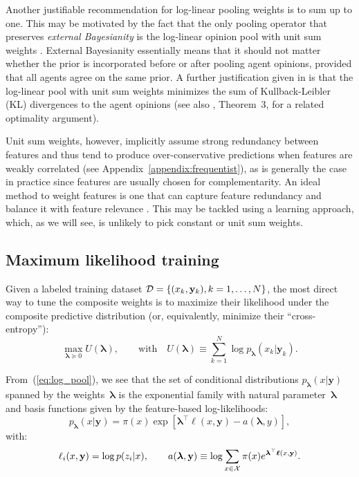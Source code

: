\documentclass[english]{scrartcl}
\def\y{{\mathbf{y}}}
\newcommand{\blambda}{{\boldsymbol{\lambda}}}
\newcommand{\bell}{{\boldsymbol{\ell}}}
\begin{document}
Another justifiable recommendation for log-linear pooling weights is to sum up to one. This may be motivated by the fact that the only pooling operator that preserves {\em external Bayesianity} is the log-linear opinion pool with unit sum weights \cite{Genest-86b}. External Bayesianity essentially means that it should not matter whether the prior is incorporated before or after pooling agent opinions, provided that all agents agree on the same prior. A further justification given in \cite{Garg-04} is that the log-linear pool with unit sum weights minimizes the sum of Kullback-Leibler (KL) divergences to the agent opinions (see also \cite{Wang-14}, Theorem~3, for a related optimality argument).

Unit sum weights, however, implicitly assume strong redundancy between features and thus tend to produce over-conservative predictions when features are weakly correlated (see Appendix~\ref{appendix:frequentist}), as is generally the case in practice since features are usually chosen for complementarity. An ideal method to weight features is one that can capture feature redundancy and balance it with feature relevance \cite{Peng-05}. This may be tackled using a learning approach, which, as we will see, is unlikely to pick constant or unit sum weights.


\subsection{Maximum likelihood training}
\label{sec:training}

Given a labeled training dataset ${\cal D}=\{(x_k,\y_k), k=1,\ldots,N\}$, the most direct way to tune the composite weights is to maximize their likelihood under the composite predictive distribution (or, equivalently, minimize their ``cross-entropy''):
\begin{equation}
\label{eq:train_likelihood}
\max_{\blambda\succeq 0} U(\blambda),
\qquad \text{with} \quad
U(\blambda) \equiv\sum_{k=1}^N \log p_\blambda(x_k|\y_k).
\end{equation}

From~(\ref{eq:log_pool}), we see that the set of conditional distributions $p_\blambda(x|\y)$ spanned by the weights~$\blambda$ is the exponential family with natural parameter~$\blambda$ and basis functions given by the feature-based log-likelihoods:
$$
p_\blambda(x|\y) = \pi(x) \exp[\blambda^\top \bell(x,\y) - a(\blambda,y)],
$$
with:
$$
\ell_i(x,\y) = \log p(z_i|x),
\qquad
a(\blambda, \y) \equiv \log \sum_{x\in{\cal X}} \pi(x) e^{\blambda^\top \bell(x,\y)}.
$$
\end{document}
